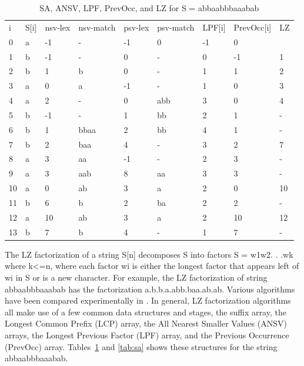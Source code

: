 \begin{table}[ht!]
\centering
\begin{tabular}{lllllllll}
i  & S{[}i{]} & nsv-lex & nsv-match & psv-lex & psv-match & LPF{[}i{]} & PrevOcc{[}i{]} & LZ \\
0  & a        & -1      & -         & -1      & 0         & -1         & 0              &    \\
1  & b        & -1      & -         & 0       & -         & 0          & -1             & 1  \\
2  & b        & 1       & b         & 0       & -         & 1          & 1              & 2  \\
3  & a        & 0       & a         & -1      & -         & 1          & 0              & 3  \\
4  & a        & 2       & -         & 0       & abb       & 3          & 0              & 4  \\
5  & b        & -1      & -         & 1       & bb        & 2          & 1              & -  \\
6  & b        & 1       & bbaa      & 2       & bb        & 4          & 1              & -  \\
7  & b        & 2       & baa       & 4       & -         & 3          & 2              & 7  \\
8  & a        & 3       & aa        & -1      & -         & 2          & 3              & -  \\
9  & a        & 3       & aab       & 8       & aa        & 3          & 3              & -  \\
10 & a        & 0       & ab        & 3       & a         & 2          & 0              & 10 \\
11 & b        & 6       & b         & 2       & ba        & 2          & 2              & -  \\
12 & a        & 10      & ab        & 3       & a         & 2          & 10             & 12 \\
13 & b        & 7       & b         & 4       & -         & 1          & 7              & - 
\end{tabular}
\caption{SA, ANSV, LPF, PrevOcc, and LZ for S = abbaabbbaaabab}
\label{tab:allsolved}
\end{table}

The LZ factorization of a string S[n] decomposes S into factors S = w1w2. . .wk where k<=n, where each factor wi is either the longest factor that appears left of wi in S or is a new character.
For example, the LZ factorization of string abbaabbbaaabab has the factorization a.b.b.a.abb.baa.ab.ab.
Various algorithms have been compared experimentally in \cite{al2012comparison}.
In general, LZ factorization algorithms all make use of a few common data structures and stages, the suffix array, the Longest Common Prefix (LCP) array, the All Nearest Smaller Values (ANSV) arrays, the Longest Previous Factor (LPF) array, and the Previous Occurrence (PrevOcc) array.
Tables~\ref{tab:allsolved} and \ref{tab:sa} shows these structures for the string abbaabbbaaabab.

